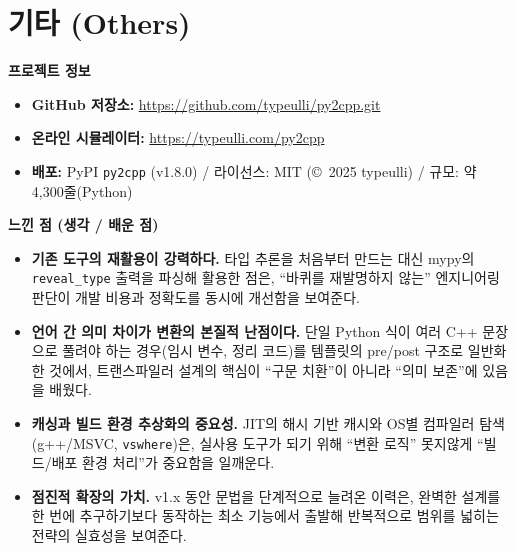 \documentclass[10pt]{article}
\begin{document}
\section{기타 (Others)}
\textbf{프로젝트 정보}
\begin{itemize}
  \item \textbf{GitHub 저장소:} \url{https://github.com/typeulli/py2cpp.git}
  \item \textbf{온라인 시뮬레이터:} \url{https://typeulli.com/py2cpp}
  \item \textbf{배포:} PyPI \texttt{py2cpp} (v1.8.0) / 라이선스: MIT (\copyright\ 2025 typeulli) / 규모: 약 4{,}300줄(Python)
\end{itemize}

\textbf{느낀 점 (생각 / 배운 점)}
\begin{itemize}
  \item \textbf{기존 도구의 재활용이 강력하다.} 타입 추론을 처음부터 만드는 대신 mypy의 \texttt{reveal\_type} 출력을 파싱해 활용한 점은, ``바퀴를 재발명하지 않는'' 엔지니어링 판단이 개발 비용과 정확도를 동시에 개선함을 보여준다.
  \item \textbf{언어 간 의미 차이가 변환의 본질적 난점이다.} 단일 Python 식이 여러 C++ 문장으로 풀려야 하는 경우(임시 변수, 정리 코드)를 템플릿의 pre/post 구조로 일반화한 것에서, 트랜스파일러 설계의 핵심이 ``구문 치환''이 아니라 ``의미 보존''에 있음을 배웠다.
  \item \textbf{캐싱과 빌드 환경 추상화의 중요성.} JIT의 해시 기반 캐시와 OS별 컴파일러 탐색(g++/MSVC, \texttt{vswhere})은, 실사용 도구가 되기 위해 ``변환 로직'' 못지않게 ``빌드/배포 환경 처리''가 중요함을 일깨운다.
  \item \textbf{점진적 확장의 가치.} v1.x 동안 문법을 단계적으로 늘려온 이력은, 완벽한 설계를 한 번에 추구하기보다 동작하는 최소 기능에서 출발해 반복적으로 범위를 넓히는 전략의 실효성을 보여준다.
\end{itemize}
\end{document}
